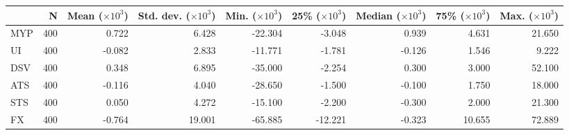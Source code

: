 \begin{tabular}{lrrrrrrrr} 
 \hline 
 \hline
 & N & Mean ($\times 10^3$) & Std. dev. ($\times 10^3$) & Min. ($\times 10^3$) & 25\% ($\times 10^3$) & Median ($\times 10^3$) & 75\% ($\times 10^3$) & Max. ($\times 10^3$) \\
\hline 
 MYP & 400 & 0.722 & 6.428 & -22.304 & -3.048 & 0.939 & 4.631 & 21.650 \\
UI & 400 & -0.082 & 2.833 & -11.771 & -1.781 & -0.126 & 1.546 & 9.222 \\
DSV & 400 & 0.348 & 6.895 & -35.000 & -2.254 & 0.300 & 3.000 & 52.100 \\
ATS & 400 & -0.116 & 4.040 & -28.650 & -1.500 & -0.100 & 1.750 & 18.000 \\
STS & 400 & 0.050 & 4.272 & -15.100 & -2.200 & -0.300 & 2.000 & 21.300 \\
FX & 400 & -0.764 & 19.001 & -65.885 & -12.221 & -0.323 & 10.655 & 72.889 \\

 \hline \hline 
 \end{tabular}
